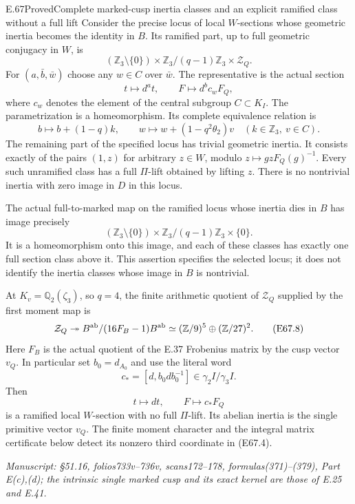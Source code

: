 \begin{statement}{E.67}{Proved}{Complete marked-cusp inertia classes and an explicit ramified class without a full lift}
Consider the precise locus of local $W$-sections whose
geometric inertia becomes the identity in $B$. Its ramified
part, up to full geometric conjugacy in $W$, is
\[
 (\mathbb Z_3\setminus\{0\})\times
       \mathbb Z_3/(q-1)\mathbb Z_3\times\mathcal Z_Q.
 \tag{E67.4}
\]
For $(a,\bar b,\bar w)$ choose any $w\in C$ over $\bar w$.
The representative is the actual section
\[
       t\longmapsto d^at,\qquad
       F\longmapsto d^b c_wF_Q,
 \tag{E67.5}
\]
where $c_w$ denotes the element of the central subgroup
$C\subset K_I$. The parametrization is a homeomorphism.
Its complete equivalence relation is
\[
 b\longmapsto b+(1-q)k,\qquad
 w\longmapsto w+(1-q^2\theta_2)v
       \quad(k\in\mathbb Z_3,\ v\in C).
 \tag{E67.6}
\]
The remaining part of the specified locus has trivial
geometric inertia. It consists exactly of the pairs
$(1,z)$ for arbitrary $z\in W$, modulo
$z\mapsto g zF_Q(g)^{-1}$. Every such unramified class has
a full $\Pi$-lift obtained by lifting $z$.
There is no nontrivial inertia with zero image in $D$ in
this locus.

The actual full-to-marked map on the ramified locus
whose inertia dies in $B$ has image precisely
\[
 (\mathbb Z_3\setminus\{0\})\times
       \mathbb Z_3/(q-1)\mathbb Z_3\times\{0\}.
 \tag{E67.7}
\]
It is a homeomorphism onto this image, and each of these
classes has exactly one full section class above it.
This assertion specifies the selected locus; it does not
identify the inertia classes whose image in $B$ is nontrivial.

At $K_v=\mathbb Q_2(\zeta_3)$, so $q=4$, the finite
arithmetic quotient of $\mathcal Z_Q$ supplied by the
first moment map is
\[
 \mathcal Z_Q\twoheadrightarrow
   B^{\rm ab}/(16F_B-1)B^{\rm ab}
       \simeq(\mathbb Z/9)^5\oplus(\mathbb Z/27)^2.
 \tag{E67.8}
\]
Here $F_B$ is the actual quotient of the E.37 Frobenius
matrix by the cusp vector $v_Q$. In particular set
$b_0=d_{A_0}$ and use the literal word
\[
          c_*=[d,b_0db_0^{-1}]\in\gamma_2I/\gamma_3I.
 \tag{E67.9}
\]
Then
\[
       t\longmapsto dt,\qquad F\longmapsto c_*F_Q
 \tag{E67.10}
\]
is a ramified local $W$-section with no full $\Pi$-lift.
Its abelian inertia is the single primitive vector $v_Q$.
The finite moment character and the integral matrix
certificate below detect its nonzero third coordinate
in (E67.4).

\emph{Manuscript: \S51.16, folios733v--736v, scans172--178,
formulas(371)--(379), Part E(c),(d); the intrinsic single
marked cusp and its exact kernel are those of E.25 and
E.41.}
\end{statement}

